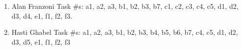 \documentclass{sigchi}
\begin{document}
\begin{enumerate}
	\item Alan Franzoni Task \#s: a1, a2, a3, b1, b2, b3, b7, c1, c2, c3, c4, c5, d1, d2, d3, d4, e1, f1, f2, f3.
	\item Hasti Ghabel Task \#s: a1,  a2, a3, b1, b2, b3, b4, b5, b6, b7, c4, c5, d1, d2, d3, d5, e1, f1, f2, f3
\end{enumerate}



\balance{}

\balance{}



\end{document}
